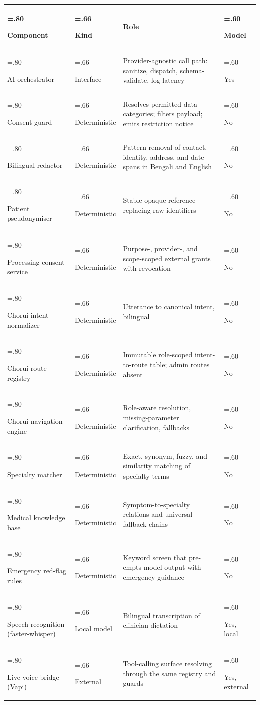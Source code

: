\documentclass[preprint,12pt,a4paper]{elsarticle}
\newcommand{\tablerowsep}{\specialrule{0.25pt}{0.6pt}{0.6pt}}
\begin{document}
\begin{table}[h]
\scriptsize
\setlength{\tabcolsep}{4pt}
\begin{tabularx}{\textwidth}{@{}>{\hsize=.80\hsize\raggedright\arraybackslash}X>{\hsize=.66\hsize\raggedright\arraybackslash}X>{\hsize=1.94\hsize\raggedright\arraybackslash}X>{\hsize=.60\hsize\raggedright\arraybackslash}X@{}}
\toprule
\textbf{Component} & \textbf{Kind} & \textbf{Role} & \textbf{Model} \\
\midrule
AI orchestrator & Interface & Provider-agnostic call path: sanitize, dispatch, schema-validate, log latency & Yes \\
\tablerowsep
Consent guard & Deterministic & Resolves permitted data categories; filters payload; emits restriction notice & No \\
\tablerowsep
Bilingual redactor & Deterministic & Pattern removal of contact, identity, address, and date spans in Bengali and English & No \\
\tablerowsep
Patient pseudonymiser & Deterministic & Stable opaque reference replacing raw identifiers & No \\
\tablerowsep
Processing-consent service & Deterministic & Purpose-, provider-, and scope-scoped external grants with revocation & No \\
\tablerowsep
Chorui intent normalizer & Deterministic & Utterance to canonical intent, bilingual & No \\
\tablerowsep
Chorui route registry & Deterministic & Immutable role-scoped intent-to-route table; admin routes absent & No \\
\tablerowsep
Chorui navigation engine & Deterministic & Role-aware resolution, missing-parameter clarification, fallbacks & No \\
\tablerowsep
Specialty matcher & Deterministic & Exact, synonym, fuzzy, and similarity matching of specialty terms & No \\
\tablerowsep
Medical knowledge base & Deterministic & Symptom-to-specialty relations and universal fallback chains & No \\
\tablerowsep
Emergency red-flag rules & Deterministic & Keyword screen that pre-empts model output with emergency guidance & No \\
\tablerowsep
Speech recognition (faster-whisper) & Local model & Bilingual transcription of clinician dictation & Yes, local \\
\tablerowsep
Live-voice bridge (Vapi) & External & Tool-calling surface resolving through the same registry and guards & Yes, external \\

\end{tabularx}
\end{table}
\end{document}
